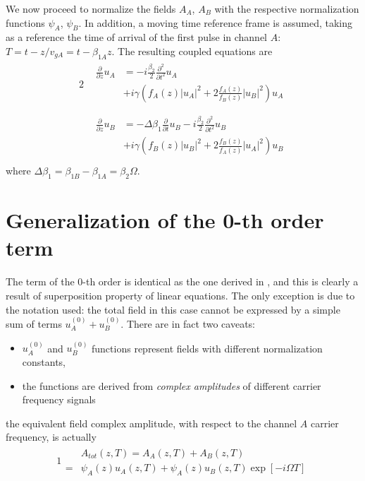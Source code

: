 \documentclass[10pt,journal]{IEEEtran}
\begin{document}
We now proceed to normalize the fields $A_A$, $A_B$ with the respective normalization functions $\psi_A$, $\psi_B$. In addition, a moving time reference frame is assumed, taking as a reference the time of arrival of the first pulse in channel $A$: $T = t - z/v_{gA} = t - \beta_{1A}z$.
The resulting coupled equations are
\begin{alignat}{2}
    &\begin{aligned}
        \frac{\partial}{\partial z} u_A &= -  i \frac{\beta_2}{2} \frac{\partial^2}{\partial t^2} u_A \\ &+ i \gamma \left(f_A(z)|u_A|^2 + 2 \frac{f_A(z)}{f_B(z)} |u_B|^2 \right)u_A \\
    \end{aligned}\label{eq:uA} \\
    &\begin{aligned}
        \frac{\partial}{\partial z} u_B &= - \Delta \beta_1 \frac{\partial}{\partial t} u_B - i \frac{\beta_2}{2} \frac{\partial^2}{\partial t^2} u_B \\ &+ i \gamma \left(f_B(z)|u_B|^2 +2 \frac{f_B(z)}{f_A(z)}|u_A|^2\right)u_B \\
    \end{aligned}\label{eq:uB}
\end{alignat}
where $\Delta \beta_1 = \beta_{1B} - \beta_{1A} = \beta_2 \Omega$.


\section{Generalization of the 0-th order term}
The term of the 0-th order is identical as the one derived in \cite{Dar_2013}, and this is clearly a result of superposition property of linear equations. The only exception is due to the notation used: the total field in this case cannot be expressed by a simple sum of terms $u_A^{(0)}+u_B^{(0)}$. There are in fact two caveats:
\begin{itemize}
 \item $u_A^{(0)}$ and $u_B^{(0)}$ functions represent fields with different normalization constants,
 \item the functions are derived from \textit{complex amplitudes} of different carrier frequency signals
\end{itemize}
the equivalent field complex amplitude, with respect to the channel $A$ carrier frequency, is actually
\begin{alignat}{1}
 \begin{aligned}
  &A_{tot}(z, T) = A_A(z, T) + A_B(z, T) \\= &\psi_A(z)u_A(z, T) + \psi_A(z)u_B(z, T) \exp[-i\Omega T]
 \end{aligned}
\end{alignat}
\end{document}
